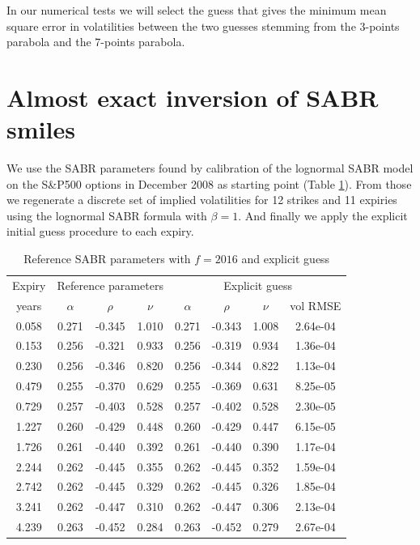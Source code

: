 \documentclass[]{rAMF2e}
\begin{document}
In our numerical tests we will select the guess that gives the minimum mean square error in volatilities between the two guesses stemming from the 3-points parabola and the 7-points parabola.
\section{Almost exact inversion of SABR smiles}
We use the SABR parameters found by calibration of the lognormal SABR model on the S\&P500 options in December 2008 as starting point (Table \ref{tbl:smart_initialguess_sabr_input}). From those we regenerate a discrete set of implied volatilities for 12 strikes and 11 expiries using the lognormal SABR formula with $\beta = 1$. And finally we apply the explicit initial guess procedure to each expiry.
\begin{table}[h]
\begin{center}
\caption{\label{tbl:smart_initialguess_sabr_input}Reference SABR parameters with $f=2016$ and explicit guess}
\begin{tabular}{c|c c c|c c c c}
\hline
Expiry & \multicolumn{3}{|c|}{Reference parameters} & \multicolumn{4}{|c}{Explicit guess}\\
years & $\alpha$ & $\rho$ & $\nu$ & $\alpha$ & $\rho$ & $\nu$ & vol RMSE \\ 
\hline
0.058&	0.271&	-0.345&	1.010 & 0.271 & -0.343 & 1.008 & 2.64e-04 \\
0.153&	0.256&	-0.321&	0.933 & 0.256 & -0.319 & 0.934 & 1.36e-04\\
0.230&	0.256&	-0.346&	0.820 & 0.256 & -0.344 & 0.822 & 1.13e-04\\
0.479&	0.255&	-0.370&	0.629 & 0.255 & -0.369 & 0.631 & 8.25e-05\\
0.729&	0.257&	-0.403&	0.528 & 0.257 & -0.402 & 0.528 & 2.30e-05\\
1.227&	0.260&	-0.429&	0.448 & 0.260 & -0.429 & 0.447 & 6.15e-05\\
1.726&	0.261&	-0.440&	0.392 & 0.261 & -0.440 & 0.390 & 1.17e-04\\
2.244&	0.262&	-0.445&	0.355 & 0.262 & -0.445 & 0.352 & 1.59e-04\\
2.742&	0.262&	-0.445&	0.329 & 0.262 & -0.445 & 0.326 & 1.85e-04\\
3.241&	0.262&	-0.447&	0.310 & 0.262 & -0.447 & 0.306 & 2.13e-04\\
4.239&	0.263&	-0.452&	0.284 & 0.263 & -0.452 & 0.279 & 2.67e-04\\
\hline
\end{tabular}
\end{center}
\end{table}
\end{document}
